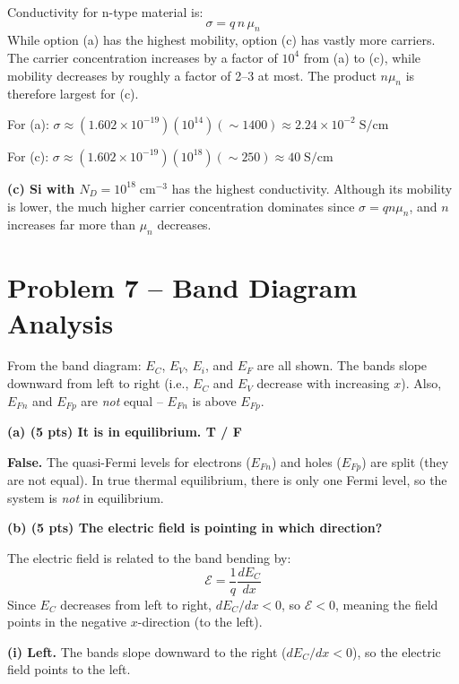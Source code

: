 \documentclass[11pt]{article}
\begin{document}
Conductivity for n-type material is:
\[
  \sigma = q \, n \, \mu_n
\]
While option (a) has the highest mobility, option (c) has vastly more carriers. The carrier concentration increases by a factor of $10^4$ from (a) to (c), while mobility decreases by roughly a factor of 2--3 at most. The product $n\mu_n$ is therefore largest for (c).

For (a): $\sigma \approx (1.602\times10^{-19})(10^{14})(\sim 1400) \approx 2.24\times10^{-2}\;\text{S/cm}$

For (c): $\sigma \approx (1.602\times10^{-19})(10^{18})(\sim 250) \approx 40\;\text{S/cm}$

\begin{answerbox}
  \textbf{(c) Si with $N_D = 10^{18}\;\text{cm}^{-3}$} has the highest conductivity. Although its mobility is lower, the much higher carrier concentration dominates since $\sigma = qn\mu_n$, and $n$ increases far more than $\mu_n$ decreases.
\end{answerbox}

\newpage

\section*{Problem 7 -- Band Diagram Analysis}

From the band diagram: $E_C$, $E_V$, $E_i$, and $E_F$ are all shown. The bands slope downward from left to right (i.e., $E_C$ and $E_V$ decrease with increasing $x$). Also, $E_{Fn}$ and $E_{Fp}$ are \emph{not} equal -- $E_{Fn}$ is above $E_{Fp}$.

\textbf{(a) (5 pts) It is in equilibrium. T / F}

\begin{answerbox}
  \textbf{False.} The quasi-Fermi levels for electrons ($E_{Fn}$) and holes ($E_{Fp}$) are split (they are not equal). In true thermal equilibrium, there is only one Fermi level, so the system is \emph{not} in equilibrium.
\end{answerbox}

\textbf{(b) (5 pts) The electric field is pointing in which direction?}

The electric field is related to the band bending by:
\[
  \mathcal{E} = \frac{1}{q}\frac{dE_C}{dx}
\]
Since $E_C$ decreases from left to right, $dE_C/dx < 0$, so $\mathcal{E} < 0$, meaning the field points in the negative $x$-direction (to the left).

\begin{answerbox}
  \textbf{(i) Left.} The bands slope downward to the right ($dE_C/dx < 0$), so the electric field points to the left.
\end{answerbox}
\end{document}
